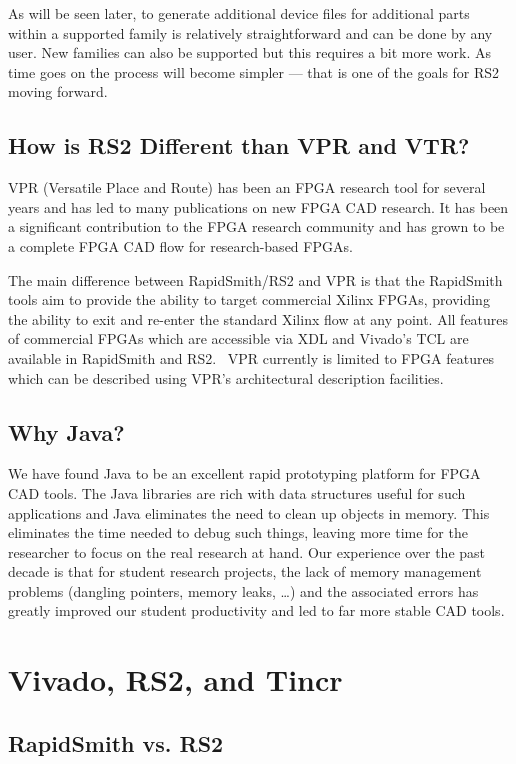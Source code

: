 \documentclass[12pt]{article}
\begin{document}
As will be seen later, to generate additional device files for additional parts
within a supported family is relatively straightforward and can be done by any
user.  New families can also be supported but this
requires a bit more work.  As time goes on the process will become simpler ---
that is one of the goals for RS2 moving forward.

\subsection{How is RS2 Different than VPR and VTR?}
VPR (Versatile Place and Route) has been an FPGA research tool for several years
and has led to many publications on new FPGA CAD research.  It has been a
significant contribution to the FPGA research community and has grown to be a
complete FPGA CAD flow for research-based FPGAs.

The main difference between RapidSmith/RS2 and VPR is that the RapidSmith tools
aim to provide the ability to target commercial Xilinx FPGAs, providing the
ability to exit and re-enter the standard Xilinx flow at any point.  All
features of commercial FPGAs which are accessible via XDL and Vivado's TCL are available
in RapidSmith and RS2.  VPR currently is limited to FPGA features which can be
described using VPR's architectural description facilities.

\subsection{Why Java?}
We have found Java to be an excellent rapid prototyping platform for FPGA CAD
tools.  The Java libraries are rich with data structures useful for such
applications and Java eliminates the need to clean up objects in memory.  This
eliminates the time needed to debug such things, leaving more time for the
researcher to focus on the real research at hand.  Our experience over the past
decade is that for student research projects, the lack of memory management
problems (dangling pointers, memory leaks, …) and the associated errors has
greatly improved our student productivity and led to far more stable CAD tools.


\section{Vivado, RS2, and Tincr}
\subsection{RapidSmith vs. RS2}
\end{document}
